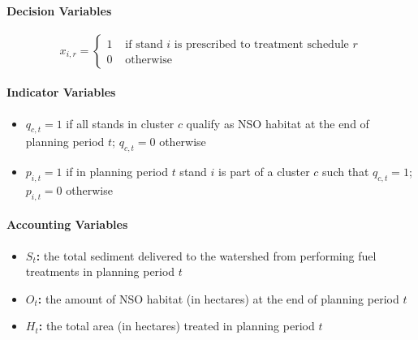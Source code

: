 \paragraph{Decision Variables}
$$
x_{i,r} = \begin{cases}
1 &\text{ if stand $i$ is prescribed to treatment schedule $r$}\\
0 &\text{ otherwise}
\end{cases}
$$ 

\paragraph{Indicator Variables}
\begin{itemize}
\item \textbf{$q_{c,t} = 1$} if all stands in cluster $c$ qualify as NSO habitat at the end of planning period $t$; $q_{c,t} = 0$ otherwise
\item \textbf{$p_{i,t} = 1$} if in planning period $t$ stand $i$ is part of a cluster $c$ such that $q_{c,t} = 1$; $p_{i,t} = 0$ otherwise
\end{itemize}

\paragraph{Accounting Variables}
\begin{itemize}
\item \textbf{$S_t$:} the total sediment delivered to the watershed from performing fuel treatments in planning period $t$
\item \textbf{$O_t$:} the amount of NSO habitat (in hectares) at the end of planning period $t$
\item \textbf{$H_t$:} the total area (in hectares) treated in planning period $t$
\end{itemize}

